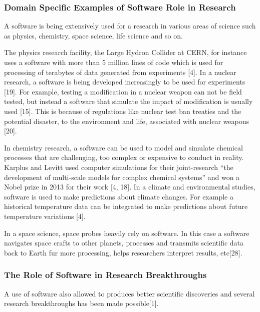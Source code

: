 \documentclass[12pt, a4paper]{article}
\begin{document}
\subsubsection{Domain Specific Examples of Software Role in  Research  }
A software is being extensively used for a research in various areas of science such as physics, chemistry, space science, life science and so on.

The physics research facility, the Large Hydron Collider at CERN, for instance uses a software with more than 5 million lines of code which is used for processing of terabytes of data generated from experiments [4].
In a nuclear research, a software is being developed increasingly to be used for experiments [19]. For example, testing a modification in a nuclear weapon can not be field tested, but instead a software that simulate the impact of modification is usually used [15]. This is because of regulations like nuclear test ban treaties and the potential disaster, to the environment and life, associated with nuclear weapons [20]. 

In chemistry research, a software can be used to model and simulate chemical processes that are challenging, too complex or expensive to conduct in reality. Karplus and Levitt used computer simulations for their joint-research “the development of multi-scale models for complex chemical systems”  and won a Nobel prize in 2013 for their work [4, 18]. 
In a climate and environmental studies, software is used to make predictions about climate changes. For example a historical temperature data can be integrated to make predictions about future temperature variations [4].

In a space science, space probes heavily rely on software. In this case a software navigates space crafts to other planets, processes and transmits scientific data back to Earth fur more processing, helps researchers interpret results, etc[28].


\subsubsection{The Role of Software in Research Breakthroughs  }
A use of software also allowed to produces better scientific discoveries and several research breakthroughs has been made possible[1]. 
\end{document}
